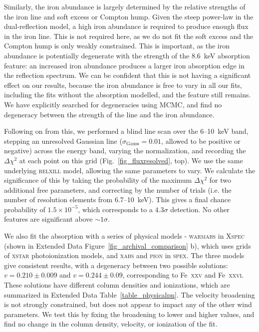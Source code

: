 \documentclass[10pt, a4paper]{article}
\begin{document}
Similarly, the iron abundance is largely determined by the relative strengths of the iron line and soft excess or Compton hump. Given the steep power-law in the dual-reflection model, a high iron abundance is required to produce enough flux in the iron line. This is not required here, as we do not fit the soft excess and the Compton hump is only weakly constrained. This is important, as the iron abundance is potentially degenerate with the strength of the 8.6~keV absorption feature: an increased iron abundance produces a larger iron absorption edge in the reflection spectrum. We can be confident that this is not having a significant effect on our results, because the iron abundance is free to vary in all our fits, including the fits without the absorption modelled, and the feature still remains. We have explicitly searched for degeneracies using MCMC, and find no degeneracy between the strength of the line and the iron abundance.


Following on from this, we performed a blind line scan over the 6--10~keV band, stepping an unresolved Gaussian line ($\sigma_\mathrm{Gauss}=0.01$, allowed to be positive or negative) across the energy band, varying the normalization, and recording the $\Delta\chi^2$ at each point on this grid (Fig.~\ref{fig_fluxresolved}, top). We use the same underlying \textsc{relxill} model, allowing the same parameters to vary. We calculate the significance of this by taking the probability of the maximum $\Delta\chi^2$ for two additional free parameters, and correcting by the number of trials (i.e. the number of resolution elements from 6.7--10~keV). This gives a final chance probability of $1.5\times10^{-5}$, which corresponds to a $4.3\sigma$ detection. No other features are significant above $\sim1\sigma$.

We also fit the absorption with a series of physical models - \textsc{warmabs} in \textsc{Xspec} (shown in Extended Data Figure~\ref{fig_archival_comparison} b), which uses grids of \textsc{xstar} photoionization models, and \textsc{xabs} and \textsc{pion} in \textsc{spex}. The three models give consistent results, with a degeneracy between two possible solutions: $v=0.210\pm0.009$ and $v=0.244\pm0.09$, corresponding to Fe~\textsc{xxv} and Fe~\textsc{xxvi}. These solutions have different column densities and ionizations, which are summarized in Extended Data Table~\ref{table_physicalpn}.
The velocity broadening is not strongly constrained, but does not appear to impact any of the other wind parameters.  We test this by fixing the broadening to lower and higher values, and find no change in the column density, velocity, or ionization of the fit.
\end{document}
